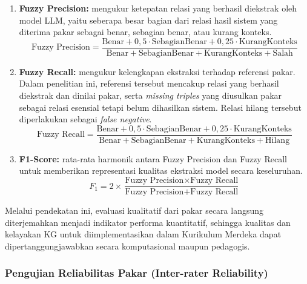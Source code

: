 \documentclass[../../thesis]{subfiles}
\begin{document}
\begin{enumerate}
  \item \textbf{Fuzzy Precision:} mengukur ketepatan relasi yang berhasil
        diekstrak oleh model LLM, yaitu seberapa besar bagian dari relasi hasil
        sistem yang diterima pakar sebagai benar, sebagian benar, atau kurang
        konteks.
        \[
          \text{Fuzzy Precision} =
          \frac{\text{Benar}
                + 0{,}5 \cdot \text{SebagianBenar}
                + 0{,}25 \cdot \text{KurangKonteks}}
               {\text{Benar}
                + \text{SebagianBenar}
                + \text{KurangKonteks}
                + \text{Salah}}
        \]

  \item \textbf{Fuzzy Recall:} mengukur kelengkapan ekstraksi terhadap referensi
        pakar. Dalam penelitian ini, referensi tersebut mencakup relasi yang
        berhasil diekstrak dan dinilai pakar, serta \textit{missing triples}
        yang diusulkan pakar sebagai relasi esensial tetapi belum dihasilkan
        sistem. Relasi hilang tersebut diperlakukan sebagai \textit{false
        negative}.
        \[
          \text{Fuzzy Recall} =
          \frac{\text{Benar}
                + 0{,}5 \cdot \text{SebagianBenar}
                + 0{,}25 \cdot \text{KurangKonteks}}
               {\text{Benar}
                + \text{SebagianBenar}
                + \text{KurangKonteks}
                + \text{Hilang}}
        \]

  \item \textbf{F1-Score:} rata-rata harmonik antara Fuzzy Precision dan
        Fuzzy Recall
        untuk memberikan representasi kualitas ekstraksi model secara
        keseluruhan.
        \[
          F_1 = 2 \times
          \frac{\text{Fuzzy Precision} \times \text{Fuzzy Recall}}
               {\text{Fuzzy Precision} + \text{Fuzzy Recall}}
        \]
\end{enumerate}

Melalui pendekatan ini, evaluasi kualitatif dari pakar secara langsung
diterjemahkan menjadi indikator performa kuantitatif, sehingga kualitas
dan kelayakan KG untuk diimplementasikan dalam Kurikulum Merdeka dapat
dipertanggungjawabkan secara komputasional maupun pedagogis.

\subsubsection{Pengujian Reliabilitas Pakar (Inter-rater Reliability)}
\end{document}
